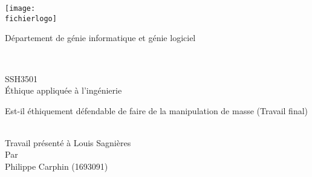 \documentclass[12pt,titlepage]{article}
\newcommand{\letitre}{Est-il éthiquement défendable de faire de la manipulation
  de masse (Travail final)\\}
\newcommand{\presentea}{Louis Sagnières\\}
\newcommand{\fichierlogo}{logo_poly.pdf}
\newcommand{\organisation}{Département de génie informatique et génie logiciel \\ }
\newcommand{\lenumcours}{SSH3501}
\newcommand{\letitrecours}{Éthique appliquée à l'ingénierie}
\newcommand{\lauteur}{Philippe Carphin (1693091)}
\begin{document}
\begin{titlepage}

\parbox[c]{1in}{\texttt{[image: \\fichierlogo]}}
\hfill \parbox[c]{3in}{\Large\raggedleft\organisation} \\
%
%
\begin{center}
\vfill
%
%
%
\large
\lenumcours \\
\letitrecours
%
%
\vfill
%
%
\parbox[b]{0.6\textwidth}{\center\letitre}\\
%
{\small Travail présenté à
\presentea}
%
\vfill
Par\\
\lauteur

\end{center}
\end{titlepage}
\end{document}
